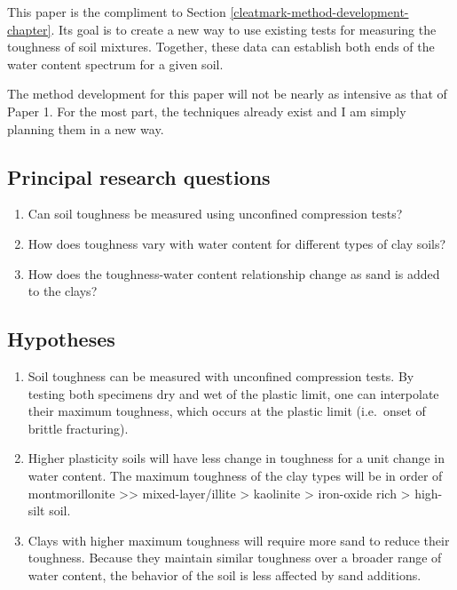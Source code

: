 \documentclass[
  letterpaper,
  openany]{book}
\begin{document}
This paper is the compliment to Section \ref{cleatmark-method-development-chapter}.
Its goal is to create a new way to use existing tests for measuring the toughness of soil mixtures.
Together, these data can establish both ends of the water content spectrum for a given soil.

The method development for this paper will not be nearly as intensive as that of Paper 1.
For the most part, the techniques already exist and I am simply planning them in a new way.

\hypertarget{principal-research-questions-2}{%
\subsection{Principal research questions}\label{principal-research-questions-2}}

\begin{enumerate}
\def\labelenumi{\arabic{enumi}.}
\item
  Can soil toughness be measured using unconfined compression tests?
\item
  How does toughness vary with water content for different types of clay soils?
\item
  How does the toughness-water content relationship change as sand is added to the clays?
\end{enumerate}

\hypertarget{hypotheses-2}{%
\subsection{Hypotheses}\label{hypotheses-2}}

\begin{enumerate}
\def\labelenumi{\arabic{enumi}.}
\item
  Soil toughness can be measured with unconfined compression tests. By testing both specimens dry and wet of the plastic limit, one can interpolate their maximum toughness, which occurs at the plastic limit (i.e.~onset of brittle fracturing).
\item
  Higher plasticity soils will have less change in toughness for a unit change in water content. The maximum toughness of the clay types will be in order of montmorillonite \textgreater\textgreater{} mixed-layer/illite \textgreater{} kaolinite \textgreater{} iron-oxide rich \textgreater{} high-silt soil.
\item
  Clays with higher maximum toughness will require more sand to reduce their toughness. Because they maintain similar toughness over a broader range of water content, the behavior of the soil is less affected by sand additions.
\end{enumerate}
\end{document}

